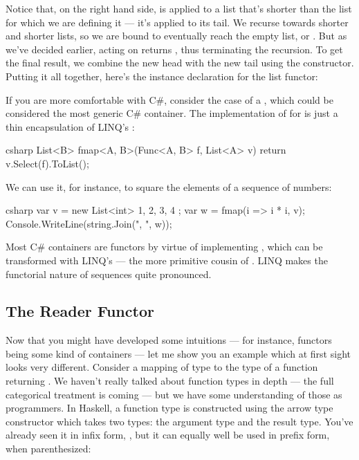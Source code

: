 Notice that, on the right hand side,  is applied to a
list that's shorter than the list for which we are defining it --- it's
applied to its tail. We recurse towards shorter and shorter lists, so we
are bound to eventually reach the empty list, or . But as
we've decided earlier,  acting on  returns
, thus terminating the recursion. To get the final result,
we combine the new head  with the new tail
 using the  constructor. Putting it
all together, here's the instance declaration for the list functor:

If you are more comfortable with C\#, consider the case of a
, which could be considered the most generic C\#
container. The implementation of  for 
is just a thin encapsulation of LINQ's :

\begin{snip}{csharp}
List<B> fmap<A, B>(Func<A, B> f, List<A> v) {
    return v.Select(f).ToList();
}
\end{snip}
We can use it, for instance, to square the elements of a sequence of
numbers:

\begin{snip}{csharp}
var v = new List<int> { 1, 2, 3, 4 };
var w = fmap(i => i * i, v);
Console.WriteLine(string.Join(", ", w));
\end{snip}
Most C\# containers are functors by virtue of implementing
, which can be transformed with LINQ's
 --- the more primitive cousin of . LINQ
makes the functorial nature of sequences quite pronounced.

\subsection{The Reader Functor}

Now that you might have developed some intuitions --- for instance,
functors being some kind of containers --- let me show you an example
which at first sight looks very different. Consider a mapping of type
 to the type of a function returning . We haven't
really talked about function types in depth --- the full categorical
treatment is coming --- but we have some understanding of those as
programmers. In Haskell, a function type is constructed using the arrow
type constructor \code{(->)} which takes two types: the
argument type and the result type. You've already seen it in infix form,
, but it can equally well be used in prefix
form, when parenthesized:


